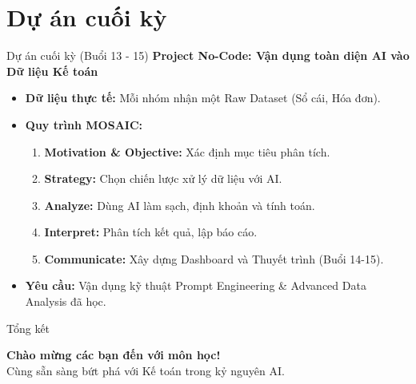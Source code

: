 \documentclass[aspectratio=169]{beamer}
\begin{document}
\section{Dự án cuối kỳ}
\begin{frame}{Dự án cuối kỳ (Buổi 13 - 15)}
    \textbf{Project No-Code: Vận dụng toàn diện AI vào Dữ liệu Kế toán}
    \begin{itemize}
        \item \textbf{Dữ liệu thực tế:} Mỗi nhóm nhận một Raw Dataset (Sổ cái, Hóa đơn).
        \item \textbf{Quy trình MOSAIC:}
        \begin{enumerate}
            \item \textbf{Motivation \& Objective:} Xác định mục tiêu phân tích.
            \item \textbf{Strategy:} Chọn chiến lược xử lý dữ liệu với AI.
            \item \textbf{Analyze:} Dùng AI làm sạch, định khoản và tính toán.
            \item \textbf{Interpret:} Phân tích kết quả, lập báo cáo.
            \item \textbf{Communicate:} Xây dựng Dashboard và Thuyết trình (Buổi 14-15).
        \end{enumerate}
        \item \textbf{Yêu cầu:} Vận dụng kỹ thuật Prompt Engineering \& Advanced Data Analysis đã học.
    \end{itemize}
\end{frame}

\begin{frame}{Tổng kết}
    \begin{center}
        \Large \textbf{Chào mừng các bạn đến với môn học!} \\
        \vspace{0.5cm}
        \normalsize Cùng sẵn sàng bứt phá với Kế toán trong kỷ nguyên AI.
    \end{center}
\end{frame}
\end{document}
